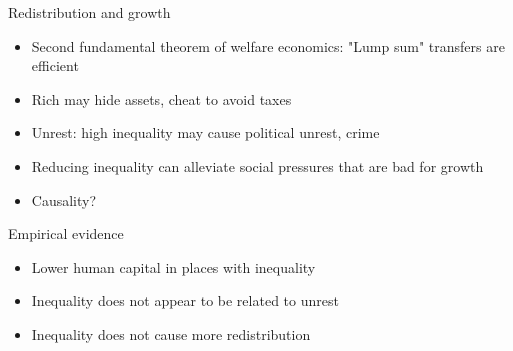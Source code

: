 \documentclass[10pt]{beamer}
\begin{document}
\begin{frame}[label={sec:orgf40697c}]{}
\alert{Redistribution and growth}
\begin{itemize}
\item Second fundamental theorem of welfare economics: "Lump sum" transfers are efficient
\item Rich may hide assets, cheat to avoid taxes
\item Unrest: high inequality may cause political unrest, crime
\item Reducing inequality can alleviate social pressures that are bad for growth
\item Causality?
\end{itemize}
\end{frame}

\begin{frame}[label={sec:org4c1370d}]{}
\alert{Empirical evidence}
\begin{itemize}
\item Lower human capital in places with inequality
\item Inequality does not appear to be related to unrest
\item Inequality does not cause more redistribution
\end{itemize}
\end{frame}
\end{document}
